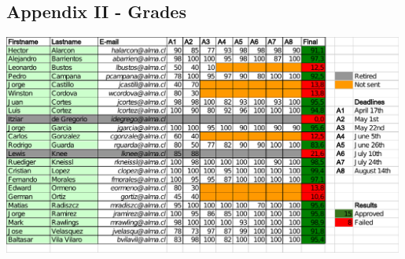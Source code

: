 \documentclass[letter, 10pt]{article}
\begin{document}
\newpage
\subsection{Appendix II - Grades}
\label{cap:grades}
\vspace{1cm}

\begin{center}
    \includegraphics[width=0.99\textwidth]{img/python-course-grades.pdf}
\end{center}

\newpage
\end{document}
